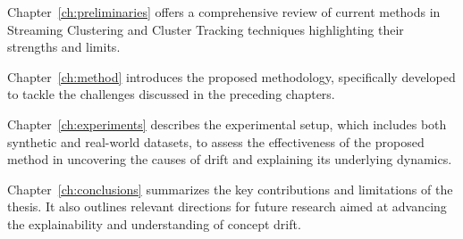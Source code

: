 Chapter~\ref{ch:preliminaries} offers a comprehensive review of current methods
in Streaming Clustering and Cluster Tracking techniques highlighting their
strengths and limits.

Chapter~\ref{ch:method} introduces the proposed methodology, specifically
developed to tackle the challenges discussed in the preceding chapters.

Chapter~\ref{ch:experiments} describes the experimental setup, which includes
both synthetic and real-world datasets, to assess the effectiveness of the
proposed method in uncovering the causes of drift and explaining its underlying
dynamics.

Chapter~\ref{ch:conclusions} summarizes the key contributions and limitations
of the thesis. It also outlines relevant directions for future research aimed
at advancing the explainability and understanding of concept drift.